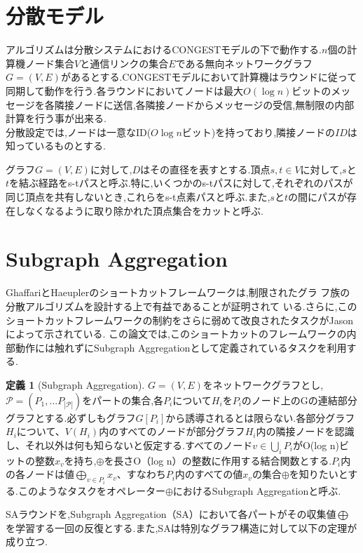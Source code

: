 \documentclass{thesis}
\theoremstyle{definition}
\newtheorem{definition}{定義}
\begin{document}
\section{分散モデル}
アルゴリズムは分散システムにおけるCONGESTモデルの下で動作する.$n$個の計算機ノード集合$V$と通信リンクの集合$E$である無向ネットワークグラフ$G=(V,E)$があるとする.CONGESTモデルにおいて計算機はラウンドに従って同期して動作を行う.各ラウンドにおいてノードは最大$O(\log n)$ビットのメッセージを各隣接ノードに送信,各隣接ノードからメッセージの受信,無制限の内部計算を行う事が出来る.\\
分散設定では,ノードは一意なID($O\log n$ビット)を持っており,隣接ノードの$ID$は知っているものとする.\par
グラフ$G=(V,E)$に対して,$D$はその直径を表すとする.頂点$s,t\in V$に対して,$s$と$t$を結ぶ経路をs-tパスと呼ぶ.特に,いくつかのs-tパスに対して,それぞれのパスが同じ頂点を共有しないとき,これらをs-t点素パスと呼ぶ.また,$s$と$t$の間にパスが存在しなくなるように取り除かれた頂点集合をカットと呼ぶ.


\section{Subgraph Aggregation}
GhaffariとHaeuplerのショートカットフレームワークは,制限されたグラ
フ族の分散アルゴリズムを設計する上で有益であることが証明されて
いる.さらに,このショートカットフレームワークの制約をさらに弱めて改良されたタスクがJasonによって示されている.
この論文では,このショートカットのフレームワークの内部動作には触れずにSubgraph Aggregationとして定義されているタスクを利用する.

\begin{definition}[Subgraph Aggregation]
    $G=(V,E)$をネットワークグラフとし,$\mathcal{P} =(P_1,...P_{|\mathcal{P}|})$をパートの集合,各$P_i$について$H_i$を$P_i$のノード上のGの連結部分グラフとする.必ずしもグラフ$G[P_i]$から誘導されるとは限らない.各部分グラフ$H_i$について、$V(H_i)$内のすべてのノードが部分グラフ$H_i$内の隣接ノードを認識し、それ以外は何も知らないと仮定する.すべてのノード$v\in \bigcup_iP_i$がO(log n)ビットの整数$x_v$を持ち,$\oplus$を長さO（log n）の整数に作用する結合関数とする.$P_i$内の各ノードは値$\bigoplus_{v\in P_i}x_v$、すなわち$P_i$内のすべての値$x_v$の集合$\oplus$を知りたいとする.このようなタスクをオペレーター$\oplus$におけるSubgraph Aggregationと呼ぶ.
\end{definition}

SAラウンドを,Subgraph Aggregation（SA）において各パートがその収集値$\bigoplus$を学習する一回の反復とする.また,SAは特別なグラフ構造に対して以下の定理が成り立つ.
\end{document}
